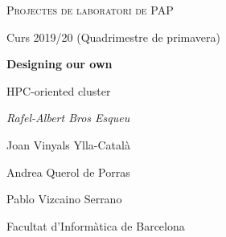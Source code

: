 \makeatletter
\begin{titlepage}
\thispagestyle{empty}
\begin{center}
	\centering
	\vspace{1cm}
	{\scshape\Large Projectes de laboratori de PAP\par}
	\vspace{0.5cm}
	{\Large Curs 2019/20 (Quadrimestre de primavera)\par}
	\vspace{3cm}
	{\huge\bfseries Designing our own\par HPC-oriented cluster\par}
	\vspace{6cm}
  {\Large \itshape Rafel-Albert Bros Esqueu\par Joan Vinyals Ylla-Català\par Andrea Querol de Porras\par Pablo Vizcaino Serrano\par}
  \vspace{0.5cm}
  \vfill
	{\large Facultat d'Informàtica de Barcelona\par}
\end{center}
\clearpage
\end{titlepage}